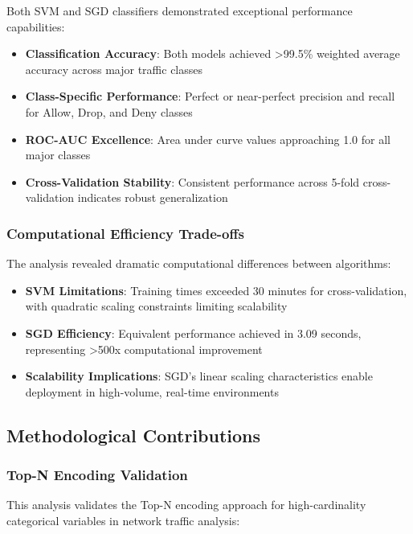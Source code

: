 \documentclass[12pt,a4paper]{article}
\begin{document}
Both SVM and SGD classifiers demonstrated exceptional performance capabilities:

\begin{itemize}
    \item \textbf{Classification Accuracy}: Both models achieved >99.5\% weighted average accuracy across major traffic classes
    \item \textbf{Class-Specific Performance}: Perfect or near-perfect precision and recall for Allow, Drop, and Deny classes
    \item \textbf{ROC-AUC Excellence}: Area under curve values approaching 1.0 for all major classes
    \item \textbf{Cross-Validation Stability}: Consistent performance across 5-fold cross-validation indicates robust generalization
\end{itemize}

\subsubsection{Computational Efficiency Trade-offs}

The analysis revealed dramatic computational differences between algorithms:

\begin{itemize}
    \item \textbf{SVM Limitations}: Training times exceeded 30 minutes for cross-validation, with quadratic scaling constraints limiting scalability
    \item \textbf{SGD Efficiency}: Equivalent performance achieved in 3.09 seconds, representing >500x computational improvement
    \item \textbf{Scalability Implications}: SGD's linear scaling characteristics enable deployment in high-volume, real-time environments
\end{itemize}

\subsection{Methodological Contributions}

\subsubsection{Top-N Encoding Validation}

This analysis validates the Top-N encoding approach for high-cardinality categorical variables in network traffic analysis:
\end{document}
